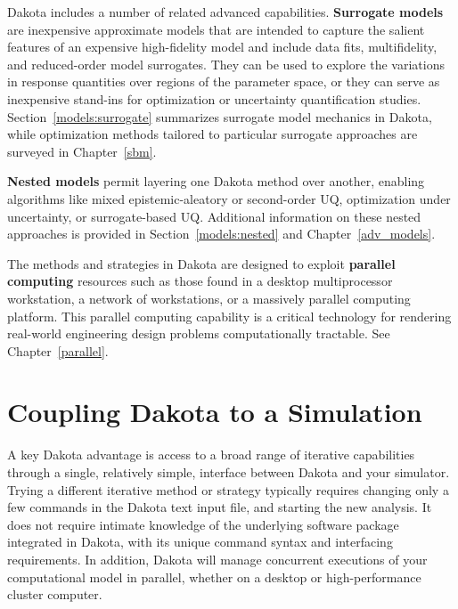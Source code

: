 Dakota includes a number of related advanced capabilities.  {\bf
  Surrogate models} are inexpensive approximate models that are
intended to capture the salient features of an expensive high-fidelity
model and include data fits, multifidelity, and reduced-order model
surrogates.  They can be used to explore the variations in response
quantities over regions of the parameter space, or they can serve as
inexpensive stand-ins for optimization or uncertainty quantification
studies.  Section~\ref{models:surrogate} summarizes surrogate model
mechanics in Dakota, while optimization methods tailored to particular
surrogate approaches are surveyed in Chapter~\ref{sbm}.

{\bf Nested models} permit layering one Dakota method over another,
enabling algorithms like mixed epistemic-aleatory or second-order UQ,
optimization under uncertainty, or surrogate-based UQ.  Additional
information on these nested approaches is provided in
Section~\ref{models:nested} and Chapter~\ref{adv_models}.

The methods and strategies in Dakota are designed to exploit {\bf
  parallel computing} resources such as those found in a desktop
multiprocessor workstation, a network of workstations, or a massively
parallel computing platform. This parallel computing capability is a
critical technology for rendering real-world engineering design
problems computationally tractable.  See Chapter~\ref{parallel}.

\section{Coupling Dakota to a Simulation}\label{intro:coupling}

A key Dakota advantage is access to a broad range of iterative
capabilities through a single, relatively simple, interface between
Dakota and your simulator. Trying a different iterative method or
strategy typically requires changing only a few commands in the Dakota
text input file, and starting the new analysis.  It does not require
intimate knowledge of the underlying software package integrated in
Dakota, with its unique command syntax and interfacing requirements.
In addition, Dakota will manage concurrent executions of your
computational model in parallel, whether on a desktop or
high-performance cluster computer.

